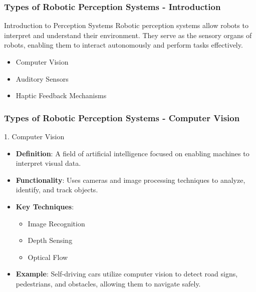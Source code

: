 \documentclass{beamer}
\begin{document}
\begin{frame}[fragile]
    \frametitle{Types of Robotic Perception Systems - Introduction}
    \begin{block}{Introduction to Perception Systems}
        Robotic perception systems allow robots to interpret and understand their environment. They serve as the sensory organs of robots, enabling them to interact autonomously and perform tasks effectively.
    \end{block}
    \begin{itemize}
        \item Computer Vision
        \item Auditory Sensors
        \item Haptic Feedback Mechanisms
    \end{itemize}
\end{frame}

\begin{frame}[fragile]
    \frametitle{Types of Robotic Perception Systems - Computer Vision}
    \begin{block}{1. Computer Vision}
        \begin{itemize}
            \item \textbf{Definition}: A field of artificial intelligence focused on enabling machines to interpret visual data.
            \item \textbf{Functionality}: Uses cameras and image processing techniques to analyze, identify, and track objects.
            \item \textbf{Key Techniques}:
                \begin{itemize}
                    \item Image Recognition
                    \item Depth Sensing
                    \item Optical Flow
                \end{itemize}
            \item \textbf{Example}: Self-driving cars utilize computer vision to detect road signs, pedestrians, and obstacles, allowing them to navigate safely.
        \end{itemize}
    \end{block}
\end{frame}
\end{document}
